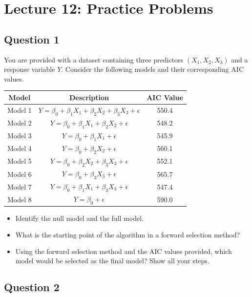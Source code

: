 \section{Lecture 12: Practice Problems}

\subsection{Question 1}

You are provided with a dataset containing three predictors $(X_1, X_2, X_3)$ and a response variable $Y$. Consider the following models and their corresponding AIC values.

\begin{center}
\begin{tabular}{|c|c|c|}
\hline
Model & Description & AIC Value \\
\hline
Model 1 & $Y = \beta_0 + \beta_1 X_1 + \beta_2 X_2 + \beta_3 X_3 + \epsilon$ & 550.4 \\
Model 2 & $Y = \beta_0 + \beta_1 X_1 + \beta_2 X_2 + \epsilon$ & 548.2 \\
Model 3 & $Y = \beta_0 + \beta_1 X_1 + \epsilon$ & 545.9 \\
Model 4 & $Y = \beta_0 + \beta_2 X_2 + \epsilon$ & 560.1 \\
Model 5 & $Y = \beta_0 + \beta_2 X_2 + \beta_3 X_3 + \epsilon$ & 552.1 \\
Model 6 & $Y = \beta_0 + \beta_3 X_3 + \epsilon$ & 565.7 \\
Model 7 & $Y = \beta_0 + \beta_1 X_1 + \beta_3 X_3 + \epsilon$ & 547.4 \\
Model 8 & $Y = \beta_0 + \epsilon$ & 590.0 \\
\hline
\end{tabular}
\end{center}

\begin{itemize}
\item[(a)] Identify the null model and the full model.

\item[(b)] What is the starting point of the algorithm in a forward selection method?

\item[(c)] Using the forward selection method and the AIC values provided, which model would be selected as the final model? Show all your steps.
\end{itemize}

\clearpage

\subsection{Question 2}

